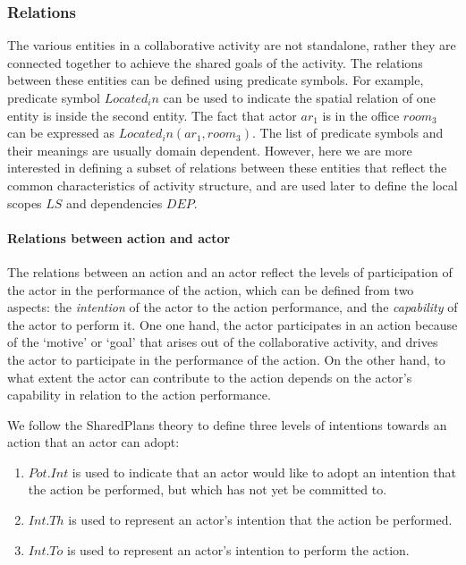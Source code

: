 \subsubsection{Relations} %
\label{ssub:relations}
The various entities in a collaborative activity are not standalone, rather they are connected together to achieve the shared goals of the activity. The relations between these entities can be defined using predicate symbols. For example, predicate symbol $Located_in$ can be used to indicate the spatial relation of one entity is inside the second entity. The fact that actor $ar_1$ is in the office $room_3$ can be expressed as $Located_in(ar_1, room_3)$. The list of predicate symbols and their meanings are usually domain dependent. However, here we are more interested in defining a subset of relations between these entities that reflect the common characteristics of activity structure, and are used later to define the local scopes $LS$ and dependencies $DEP$.

\paragraph*{Relations between action and actor} %
\label{par:relations_between_action_and_actor}
The relations between an action and an actor reflect the levels of participation of the actor in the performance of the action, which can be defined from two aspects: the \emph{intention} of the actor to the action performance, and the \emph{capability} of the actor to perform it. One one hand, the actor participates in an action because of the `motive' or `goal' that arises out of the collaborative activity, and drives the actor to participate in the performance of the action. On the other hand, to what extent the actor can contribute to the action depends on the actor's capability in relation to the action performance. 

We follow the SharedPlans theory \cite{grosz1996collaborative} to define three levels of intentions towards an action that an actor can adopt:

\begin{enumerate}
	\item $Pot.Int$ is used to indicate that an actor would like to adopt an intention that the action be performed, but which has not yet be committed to.
	\item $Int.Th$ is used to represent an actor's intention that the action be performed.
	\item $Int.To$ is used to represent an actor's intention to perform the action.
\end{enumerate}

